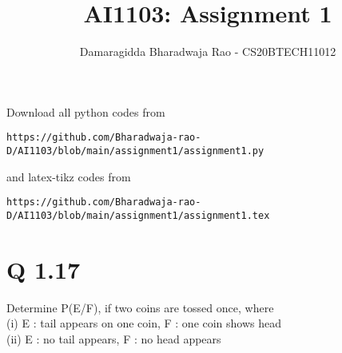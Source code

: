 \documentclass[journal,12pt,twocolumn]{IEEEtran}
\begin{document}
     \def\rightbox#1{\makebox[0in][r]{#1}}
     \def\centbox#1{\makebox[0in]{#1}}
     \def\topbox#1{\raisebox{-\baselineskip}[0in][0in]{#1}}
     \def\midbox#1{\raisebox{-0.5\baselineskip}[0in][0in]{#1}}
\vspace{3cm}
\title{AI1103: Assignment 1}
\author{Damaragidda Bharadwaja Rao - CS20BTECH11012}
\maketitle
\newpage
\bigskip
\renewcommand{\thefigure}{\theenumi}
\renewcommand{\thetable}{\theenumi}
Download all python codes from 
\begin{lstlisting}
https://github.com/Bharadwaja-rao-D/AI1103/blob/main/assignment1/assignment1.py
\end{lstlisting}
%
and latex-tikz codes from 
%
\begin{lstlisting}
https://github.com/Bharadwaja-rao-D/AI1103/blob/main/assignment1/assignment1.tex
\end{lstlisting}
\section*{Q 1.17 }
Determine P(E/F), if two coins are
tossed once, where\\
(i) E : tail appears on one coin, F : one coin
shows head\\
(ii) E : no tail appears, F : no head appears\\
\end{document}
